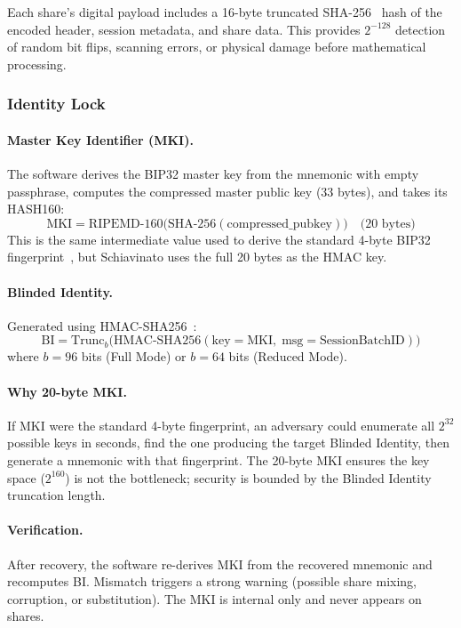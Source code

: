\documentclass[11pt]{article}
\begin{document}
Each share's digital payload includes a 16-byte truncated SHA-256~\cite{fips1804} hash of the encoded header, session metadata, and share data. This provides $2^{-128}$ detection of random bit flips, scanning errors, or physical damage before mathematical processing.

\subsubsection{Identity Lock}
\label{sec:identity-lock}

\paragraph{Master Key Identifier (MKI).} The software derives the BIP32 master key from the mnemonic with empty passphrase, computes the compressed master public key (33 bytes), and takes its HASH160:
\[
    \text{MKI} = \text{RIPEMD-160}\bigl(\text{SHA-256}(\text{compressed\_pubkey})\bigr) \quad \text{(20 bytes)}
\]
This is the same intermediate value used to derive the standard 4-byte BIP32 fingerprint~\cite{bip32}, but Schiavinato uses the full 20 bytes as the HMAC key.

\paragraph{Blinded Identity.} Generated using HMAC-SHA256~\cite{rfc2104}:
\[
    \text{BI} = \text{Trunc}_b\bigl(\text{HMAC-SHA256}(\text{key} = \text{MKI},\; \text{msg} = \text{SessionBatchID})\bigr)
\]
where $b = 96$ bits (Full Mode) or $b = 64$ bits (Reduced Mode).

\paragraph{Why 20-byte MKI.} If MKI were the standard 4-byte fingerprint, an adversary could enumerate all $2^{32}$ possible keys in seconds, find the one producing the target Blinded Identity, then generate a mnemonic with that fingerprint. The 20-byte MKI ensures the key space ($2^{160}$) is not the bottleneck; security is bounded by the Blinded Identity truncation length.

\paragraph{Verification.} After recovery, the software re-derives MKI from the recovered mnemonic and recomputes BI. Mismatch triggers a strong warning (possible share mixing, corruption, or substitution). The MKI is internal only and never appears on shares.
\end{document}
